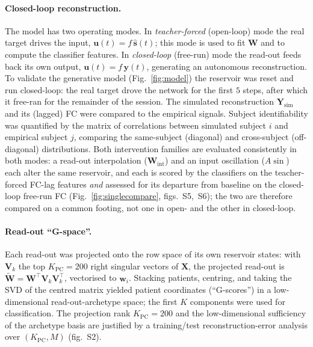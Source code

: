 \documentclass[11pt]{article}
\begin{document}
\paragraph{Closed-loop reconstruction.}
The model has two operating modes. In \emph{teacher-forced} (open-loop) mode the
real target drives the input, $\mathbf{u}(t)=f\,\hat{\mathbf{s}}(t)$; this mode is
used to fit $\mathbf{W}$ and to compute the classifier features. In
\emph{closed-loop} (free-run) mode the read-out feeds back its own output,
$\mathbf{u}(t)=f\,\mathbf{y}(t)$, generating an autonomous reconstruction. To
validate the generative model (Fig.~\ref{fig:model}) the reservoir was reset and
run closed-loop: the real target drove the network for the first $5$ steps, after
which it free-ran for the remainder of the session. The
simulated reconstruction $\mathbf{Y}_{\mathrm{sim}}$ and its (lagged) FC were
compared to the empirical signals. Subject identifiability was quantified by
the matrix of correlations between simulated subject $i$ and empirical subject
$j$, comparing the same-subject (diagonal) and cross-subject (off-diagonal)
distributions. Both intervention families are evaluated consistently in both
modes: a read-out interpolation ($\mathbf{W}_{\mathrm{int}}$) and an input
oscillation ($A\sin$) each alter the same reservoir, and each is scored by the
classifiers on the teacher-forced FC-lag features \emph{and} assessed for its
departure from baseline on the closed-loop free-run FC
(Fig.~\ref{fig:singlecompare}, figs.~S5,~S6); the two are therefore compared on a
common footing, not one in open- and the other in closed-loop.

\paragraph{Read-out ``G-space''.}
Each read-out was projected onto the row space of its own reservoir states:
with $\mathbf{V}_{k}$ the top $K_{\mathrm{PC}}=200$ right singular vectors of
$\mathbf{X}$, the projected read-out is
$\widetilde{\mathbf{W}}=\mathbf{W}^{\!\top}\mathbf{V}_{k}\mathbf{V}_{k}^{\!\top}$,
vectorised to $\mathbf{w}_i$. Stacking patients, centring, and taking the SVD
of the centred matrix yielded patient coordinates (``G-scores'') in a
low-dimensional read-out-archetype space; the first $K$ components were used for
classification. The projection rank $K_{\mathrm{PC}}=200$ and the
low-dimensional sufficiency of the archetype basis are justified by a
training/test reconstruction-error analysis over $(K_{\mathrm{PC}},M)$
(fig.~S2).
\end{document}
